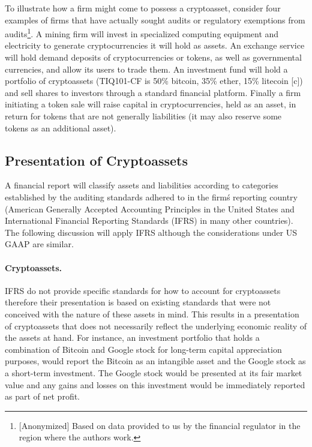 To illustrate how a firm might come to possess a cryptoasset, consider four examples of firms that have actually sought audits or regulatory exemptions from audits\footnote{[Anonymized] Based on data provided to us by the financial regulator in the region where the authors work.}. A mining firm will invest in specialized computing equipment and electricity to generate cryptocurrencies it will hold as assets. An exchange service will hold demand deposits of cryptocurrencies or tokens, as well as governmental currencies, and allow its users to trade them. An investment fund will hold a portfolio of cryptoassets (\eg TIQ101-CF is 50\% bitcoin, 35\% ether, 15\% litecoin [c]) and sell shares to investors through a standard financial platform. Finally a firm initiating a token sale will raise capital in cryptocurrencies, held as an asset, in return for tokens that are not generally liabilities (it may also reserve some tokens as an additional asset).



\subsection{Presentation of Cryptoassets}
A financial report will classify assets and liabilities according to categories established by the auditing standards adhered to in the firm\'s reporting country (American Generally Accepted Accounting Principles in the United States and International Financial Reporting Standards (IFRS) in many other countries). The following discussion will apply IFRS although the considerations under US GAAP are similar.



\paragraph{Cryptoassets.} IFRS do not provide specific standards for how to account for cryptoassets therefore their presentation is based on existing standards that were not conceived with the nature of these assets in mind. This results in a presentation of cryptoassets that does not necessarily reflect the underlying economic reality of the assets at hand. For instance, an investment portfolio that holds a combination of Bitcoin and Google stock for long-term capital appreciation purposes, would report the Bitcoin as an intangible asset and the Google stock as a short-term investment. The Google stock would be presented at its fair market value and any gains and losses on this investment would be immediately reported as part of net profit. 

